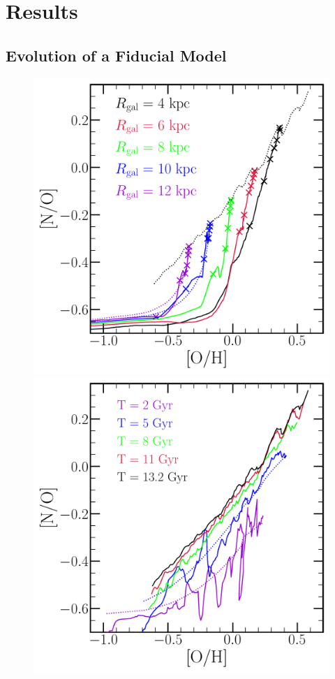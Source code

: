 \documentclass[ms.tex]{subfiles}
\begin{document}
\section{Results}
\label{sec:results}

\subsection{Evolution of a Fiducial Model}
\label{sec:results:fiducial}

\begin{figure}
\centering
\includegraphics[scale = 0.45]{no_oh_superposition.pdf}
\includegraphics[scale = 0.45]{no_oh_timeevol.pdf}

\end{figure}
\end{document}
